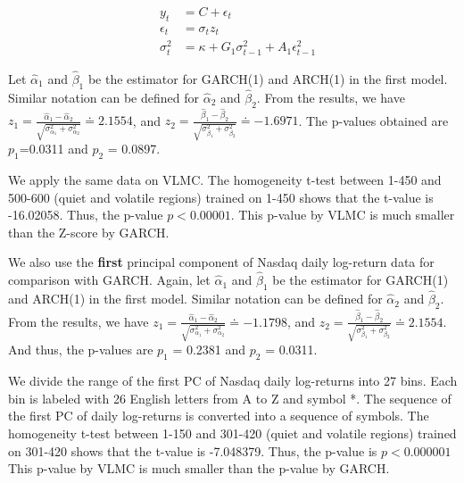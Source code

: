 \documentclass{beamer}
\begin{document}
\begin{frame}
\begin{eqnarray}
&y_{t}&= C+\epsilon_{t}\\
&\epsilon_{t}& = \sigma_tz_t \\
&\sigma_t^2& = \kappa+G_1\sigma_{t-1}^2+A_1\epsilon_{t-1}^2
\end{eqnarray}
\par Let $\hat{\alpha}_1$ and $\hat{\beta}_1$ be the estimator for GARCH(1) and ARCH(1) in the first model.
Similar notation can be defined for $\hat{\alpha}_2$ and $\hat{\beta}_2$. From the results, we have $z_1=\frac{\hat{\alpha}_1-\hat{\alpha}_2}{\sqrt{\sigma^2_{\alpha_1}+\sigma^2_{\alpha_2}}}\doteq2.1554$,
and $z_2=\frac{\hat{\beta}_1-\hat{\beta}_2}{\sqrt{\sigma^2_{\beta_1}+\sigma^2_{\beta_2}}}\doteq -1.6971$. The p-values obtained are $p_1$=0.0311 and $p_2$ = 0.0897.

\par We apply the same data on VLMC. The homogeneity t-test between 1-450 and 500-600 (quiet and volatile regions) trained on 1-450 shows that the t-value is -16.02058.
Thus, the p-value $p<0.00001$. This p-value by VLMC is much smaller than the Z-score by GARCH.

\end{frame}

\begin{frame}
\par We also use the {\bf first} principal component of Nasdaq daily log-return data for comparison with GARCH.
Again, let $\hat{\alpha}_1$ and $\hat{\beta}_1$ be the estimator for GARCH(1) and ARCH(1) in the first model.
Similar notation can be defined for $\hat{\alpha}_2$ and $\hat{\beta}_2$. From the results,
we have
$z_1=\frac{\hat{\alpha}_1-\hat{\alpha}_2}{\sqrt{\sigma^2_{\alpha_1}+\sigma^2_{\alpha_2}}}\doteq -1.1798$, and $z_2=\frac{\hat{\beta}_1-\hat{\beta}_2}{\sqrt{\sigma^2_{\beta_1}+\sigma^2_{\beta_2}}}\doteq 2.1554$. And thus, the p-values are $p_1$ = 0.2381 and $p_2$ = 0.0311.

\par We divide the range of the first PC of Nasdaq daily log-returns into 27 bins. Each bin is labeled with 26 English letters from A to Z and symbol *.
The sequence of the first PC of daily log-returns is converted into a sequence of symbols. The homogeneity t-test between 1-150 and 301-420
(quiet and volatile regions) trained on 301-420 shows that the t-value is -7.048379. Thus, the p-value is $p<0.000001$ This p-value by VLMC is much smaller than the p-value by GARCH.




\end{frame}
\end{document}
